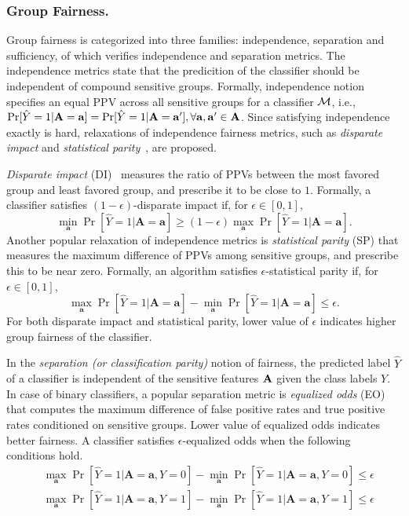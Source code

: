 \subsubsection{Group Fairness.} Group fairness is categorized into three families: independence, separation and sufficiency, of which {\justicia} verifies independence and separation metrics. 
The independence metrics state that the predicition of the classifier should be independent of compound sensitive groups. Formally, independence notion specifies an equal PPV across all sensitive groups for a classifier $\mathcal{M}$, i.e., $\Pr[\hat{Y} =1 | \mathbf{A} =  \mathbf{a}]  =  \Pr[\hat{Y} =1 | \mathbf{A} =  \mathbf{a}'] , \forall \mathbf{a}, \mathbf{a}' \in \mathbf{A}$.
Since satisfying independence exactly is hard, relaxations of independence fairness metrics, such as \textit{disparate impact} and \textit{statistical parity}~\cite{dwork2012fairness,feldman2015certifying}, are proposed. 

\textit{Disparate impact} (DI)~\cite{feldman2015certifying} measures the ratio of PPVs between the most favored group and least favored group, and prescribe it to be close to $1$. Formally, a classifier satisfies $(1 - \epsilon)$-disparate impact if, for $\epsilon \in [0,1] $,
\[
\min_{\mathbf{a}} \Pr[\hat{Y} =1 | \mathbf{A} =  \mathbf{a}]  \ge (1 - \epsilon) \max_{\mathbf{a}} \Pr[\hat{Y} =1 | \mathbf{A} =  \mathbf{a}].
\]
Another popular relaxation of independence metrics  is \textit{statistical parity} (SP) that measures the maximum difference of PPVs among sensitive groups, and prescribe this to be near zero. Formally, an algorithm satisfies $\epsilon$-statistical parity if, for $\epsilon \in [0,1] $, 
\[
\max_{\mathbf{a}}\Pr[\hat{Y} =1 | \mathbf{A} = \mathbf{a}] - \min_{\mathbf{a}}\Pr [\hat{Y} = 1| \mathbf{A} = \mathbf{a}] \le \epsilon.
\]
For both disparate impact and statistical parity, lower value of $\epsilon$ indicates higher group fairness of the classifier. 


In the \textit{separation (or classification parity)} notion of fairness, the predicted label $\hat{Y}$ of a classifier is independent of the sensitive features $\mathbf{A}$ given the class labels $Y$. In case of binary classifiers, a popular separation metric is \textit{equalized odds} (EO)~\cite{hardt2016equality} that computes the maximum difference of false positive rates  and true positive rates  conditioned on sensitive groups.  Lower value of equalized odds indicates better fairness. A classifier satisfies $\epsilon$-equalized odds when the following conditions hold.
\begin{align*}
	&\max_{\mathbf{a}} \Pr[\hat{Y} =1 |\mathbf{A}= \mathbf{a}, Y= 0  ] - 	\min_{\mathbf{a}} \Pr [\hat{Y} = 1|\mathbf{A}= \mathbf{a}, Y = 0] \le \epsilon\\
	&\max_{\mathbf{a}}\Pr[\hat{Y} =1 |\mathbf{A}= \mathbf{a}, Y= 1  ] - 	\min_{\mathbf{a}}  \Pr [\hat{Y} = 1|\mathbf{A}= \mathbf{a}, Y = 1] \le \epsilon
\end{align*}



